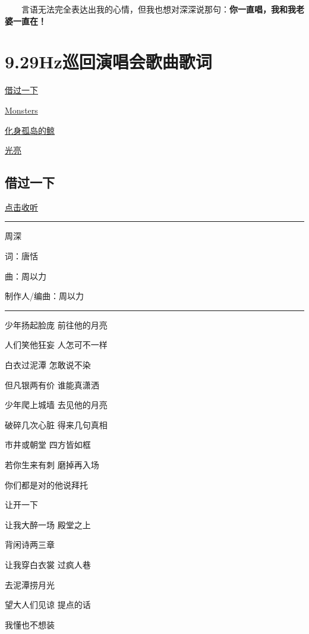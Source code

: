 \documentclass[
]{book}
\begin{document}
  言语无法完全表达出我的心情，但我也想对深深说那句：\textbf{你一直唱，我和我老婆一直在！}

\chapter{9.29Hz巡回演唱会歌曲歌词}\label{appendix-song-lyric}

\hyperref[I-will-go-my-way]{借过一下}

\hyperref[Monsters]{Monsters}

\hyperref[hua-shen-gu-dao-de-jing]{化身孤岛的鲸}

\hyperref[guangliang]{光亮}

\section*{借过一下}\label{I-will-go-my-way}

\href{https://y.qq.com/n/ryqq/songDetail/00446BOH0yUBXf}{点击收听}

\begin{center}\rule{0.5\linewidth}{0.5pt}\end{center}

周深

词：唐恬

曲：周以力

制作人/编曲：周以力

\begin{center}\rule{0.5\linewidth}{0.5pt}\end{center}

少年扬起脸庞 前往他的月亮

人们笑他狂妄 人怎可不一样

白衣过泥潭 怎敢说不染

但凡银两有价 谁能真潇洒

少年爬上城墙 去见他的月亮

破碎几次心脏 得来几句真相

市井或朝堂 四方皆如框

若你生来有刺 磨掉再入场

你们都是对的他说拜托

让开一下

让我大醉一场 殿堂之上

背闲诗两三章

让我穿白衣裳 过疯人巷

去泥潭捞月光

望大人们见谅 提点的话

我懂也不想装
\end{document}
